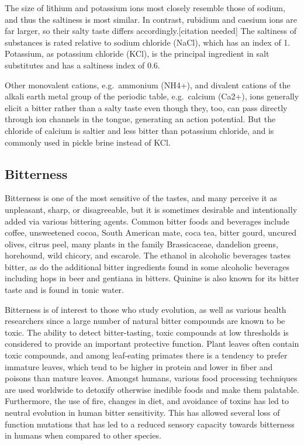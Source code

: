 The size of lithium and potassium ions most closely resemble those of sodium, and thus the saltiness is most similar. In contrast, rubidium and caesium ions are far larger, so their salty taste differs accordingly.{[}citation needed{]} The saltiness of substances is rated relative to sodium chloride (NaCl), which has an index of 1. Potassium, as potassium chloride (KCl), is the principal ingredient in salt substitutes and has a saltiness index of 0.6.

Other monovalent cations, e.g.~ammonium (NH4+), and divalent cations of the alkali earth metal group of the periodic table, e.g.~calcium (Ca2+), ions generally elicit a bitter rather than a salty taste even though they, too, can pass directly through ion channels in the tongue, generating an action potential. But the chloride of calcium is saltier and less bitter than potassium chloride, and is commonly used in pickle brine instead of KCl.

\hypertarget{bitterness}{%
\subsection{Bitterness}\label{bitterness}}

Bitterness is one of the most sensitive of the tastes, and many perceive it as unpleasant, sharp, or disagreeable, but it is sometimes desirable and intentionally added via various bittering agents. Common bitter foods and beverages include coffee, unsweetened cocoa, South American mate, coca tea, bitter gourd, uncured olives, citrus peel, many plants in the family Brassicaceae, dandelion greens, horehound, wild chicory, and escarole. The ethanol in alcoholic beverages tastes bitter, as do the additional bitter ingredients found in some alcoholic beverages including hops in beer and gentiana in bitters. Quinine is also known for its bitter taste and is found in tonic water.

Bitterness is of interest to those who study evolution, as well as various health researchers since a large number of natural bitter compounds are known to be toxic. The ability to detect bitter-tasting, toxic compounds at low thresholds is considered to provide an important protective function. Plant leaves often contain toxic compounds, and among leaf-eating primates there is a tendency to prefer immature leaves, which tend to be higher in protein and lower in fiber and poisons than mature leaves. Amongst humans, various food processing techniques are used worldwide to detoxify otherwise inedible foods and make them palatable. Furthermore, the use of fire, changes in diet, and avoidance of toxins has led to neutral evolution in human bitter sensitivity. This has allowed several loss of function mutations that has led to a reduced sensory capacity towards bitterness in humans when compared to other species.

